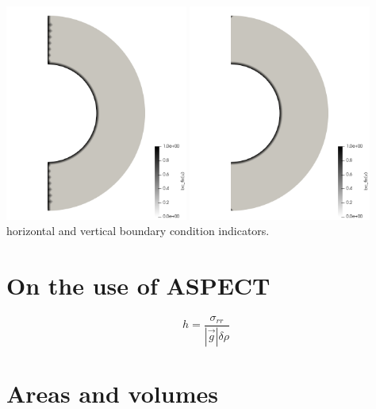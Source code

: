 \begin{center}
\includegraphics[width=6cm]{python_codes/fieldstone_152/images/bcfix_u}
\includegraphics[width=6cm]{python_codes/fieldstone_152/images/bcfix_v}\\
{\captionfont horizontal and vertical boundary condition indicators.}
\end{center}

\newpage
\section*{On the use of ASPECT}

\[
h = \frac{\sigma_{rr}}{|\vec{g}| \delta\rho}
\]






\newpage
\section*{Areas and volumes}

